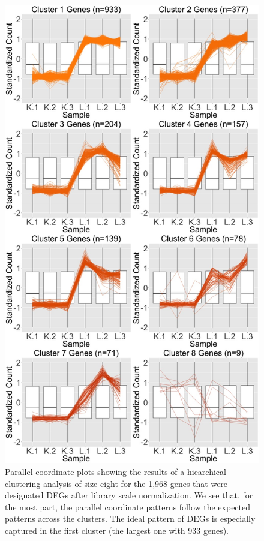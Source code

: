 \documentclass{article}
\begin{document}
\begin{figure}[!p]
\centerline{\includegraphics[width=1\columnwidth]{../Bioinformatics/Pictures/liverKidney/Clustering_data_FDR_001_TMMvRaw_Orig/K_L_8.jpg}}
\caption{Parallel coordinate plots showing the results of a hiearchical clustering analysis of size eight for the 1,968 genes that were designated DEGs after library scale normalization. We see that, for the most part, the parallel coordinate patterns follow the expected patterns across the clusters. The ideal pattern of DEGs is especially captured in the first cluster (the largest one with 933 genes).
\label{OrigPCP}}
\end{figure}
\end{document}
